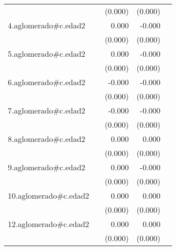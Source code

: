 {\begin{longtable}{l*{4}{D{.}{.}{-1}}}
            &                     &     (0.000)         &     (0.000)         &                     \\
\addlinespace
4.aglomerado#c.edad2&                     &       0.000         &      -0.000         &                     \\
            &                     &     (0.000)         &     (0.000)         &                     \\
\addlinespace
5.aglomerado#c.edad2&                     &       0.000         &      -0.000         &                     \\
            &                     &     (0.000)         &     (0.000)         &                     \\
\addlinespace
6.aglomerado#c.edad2&                     &      -0.000         &      -0.000\sym{***}&                     \\
            &                     &     (0.000)         &     (0.000)         &                     \\
\addlinespace
7.aglomerado#c.edad2&                     &      -0.000         &      -0.000         &                     \\
            &                     &     (0.000)         &     (0.000)         &                     \\
\addlinespace
8.aglomerado#c.edad2&                     &       0.000\sym{***}&       0.000\sym{*}  &                     \\
            &                     &     (0.000)         &     (0.000)         &                     \\
\addlinespace
9.aglomerado#c.edad2&                     &       0.000         &      -0.000         &                     \\
            &                     &     (0.000)         &     (0.000)         &                     \\
\addlinespace
10.aglomerado#c.edad2&                     &       0.000\sym{**} &       0.000         &                     \\
            &                     &     (0.000)         &     (0.000)         &                     \\
\addlinespace
12.aglomerado#c.edad2&                     &       0.000\sym{**} &       0.000         &                     \\
            &                     &     (0.000)         &     (0.000)         &                     \\

\end{longtable}}
